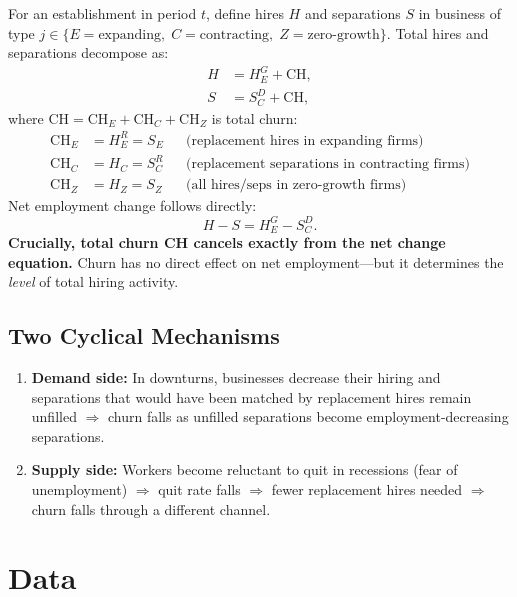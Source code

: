 For an establishment in period $t$, define hires $H$ and separations $S$ in
business of type $j\in\{E=\text{expanding},\;C=\text{contracting},\;
Z=\text{zero-growth}\}$. Total hires and separations decompose as:
\begin{align}
  H &= H^G_E + \text{CH}, \label{eq:hires_decomp} \\
  S &= S^D_C + \text{CH}, \label{eq:seps_decomp}
\end{align}
where $\text{CH}=\text{CH}_E+\text{CH}_C+\text{CH}_Z$ is total churn:
\begin{align}
  \text{CH}_E &= H^R_E = S_E
    &&\text{(replacement hires in expanding firms)} \\
  \text{CH}_C &= H_C = S^R_C
    &&\text{(replacement separations in contracting firms)} \\
  \text{CH}_Z &= H_Z = S_Z
    &&\text{(all hires/seps in zero-growth firms)}
\end{align}
Net employment change follows directly:
\begin{equation}
  H - S = H^G_E - S^D_C.
  \label{eq:net_change}
\end{equation}
\textbf{Crucially, total churn CH cancels exactly from the net change
equation.} Churn has no direct effect on net employment---but it determines
the \emph{level} of total hiring activity.

\subsection*{Two Cyclical Mechanisms}

\begin{enumerate}
  \item \textbf{Demand side:} In downturns, businesses decrease their hiring
    and separations that would have been matched by replacement hires remain
    unfilled $\Rightarrow$ churn falls as unfilled separations become
    employment-decreasing separations.
  \item \textbf{Supply side:} Workers become reluctant to quit in recessions
    (fear of unemployment) $\Rightarrow$ quit rate falls $\Rightarrow$ fewer
    replacement hires needed $\Rightarrow$ churn falls through a different
    channel.
\end{enumerate}

\section{Data}

